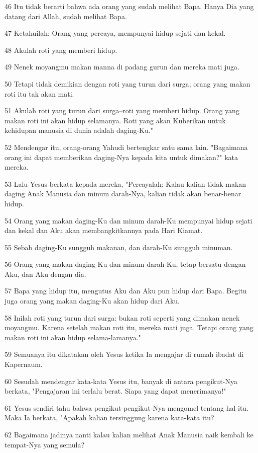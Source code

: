 \par 46 Itu tidak berarti bahwa ada orang yang sudah melihat Bapa. Hanya Dia yang datang dari Allah, sudah melihat Bapa.
\par 47 Ketahuilah: Orang yang percaya, mempunyai hidup sejati dan kekal.
\par 48 Akulah roti yang memberi hidup.
\par 49 Nenek moyangmu makan manna di padang gurun dan mereka mati juga.
\par 50 Tetapi tidak demikian dengan roti yang turun dari surga; orang yang makan roti itu tak akan mati.
\par 51 Akulah roti yang turun dari surga--roti yang memberi hidup. Orang yang makan roti ini akan hidup selamanya. Roti yang akan Kuberikan untuk kehidupan manusia di dunia adalah daging-Ku."
\par 52 Mendengar itu, orang-orang Yahudi bertengkar satu sama lain. "Bagaimana orang ini dapat memberikan daging-Nya kepada kita untuk dimakan?" kata mereka.
\par 53 Lalu Yesus berkata kepada mereka, "Percayalah: Kalau kalian tidak makan daging Anak Manusia dan minum darah-Nya, kalian tidak akan benar-benar hidup.
\par 54 Orang yang makan daging-Ku dan minum darah-Ku mempunyai hidup sejati dan kekal dan Aku akan membangkitkannya pada Hari Kiamat.
\par 55 Sebab daging-Ku sungguh makanan, dan darah-Ku sungguh minuman.
\par 56 Orang yang makan daging-Ku dan minum darah-Ku, tetap bersatu dengan Aku, dan Aku dengan dia.
\par 57 Bapa yang hidup itu, mengutus Aku dan Aku pun hidup dari Bapa. Begitu juga orang yang makan daging-Ku akan hidup dari Aku.
\par 58 Inilah roti yang turun dari surga: bukan roti seperti yang dimakan nenek moyangmu. Karena setelah makan roti itu, mereka mati juga. Tetapi orang yang makan roti ini akan hidup selama-lamanya."
\par 59 Semuanya itu dikatakan oleh Yesus ketika Ia mengajar di rumah ibadat di Kapernaum.
\par 60 Sesudah mendengar kata-kata Yesus itu, banyak di antara pengikut-Nya berkata, "Pengajaran ini terlalu berat. Siapa yang dapat menerimanya!"
\par 61 Yesus sendiri tahu bahwa pengikut-pengikut-Nya mengomel tentang hal itu. Maka Ia berkata, "Apakah kalian tersinggung karena kata-kata itu?
\par 62 Bagaimana jadinya nanti kalau kalian melihat Anak Manusia naik kembali ke tempat-Nya yang semula?
